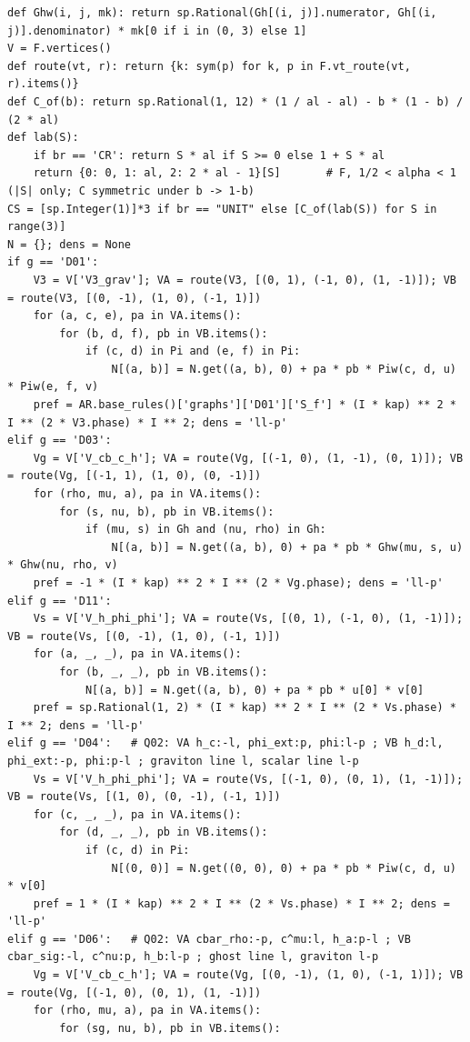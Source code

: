 \documentclass[10pt]{article}
\begin{document}
\begin{lstlisting}
def Ghw(i, j, mk): return sp.Rational(Gh[(i, j)].numerator, Gh[(i, j)].denominator) * mk[0 if i in (0, 3) else 1]
V = F.vertices()
def route(vt, r): return {k: sym(p) for k, p in F.vt_route(vt, r).items()}
def C_of(b): return sp.Rational(1, 12) * (1 / al - al) - b * (1 - b) / (2 * al)
def lab(S):
    if br == 'CR': return S * al if S >= 0 else 1 + S * al
    return {0: 0, 1: al, 2: 2 * al - 1}[S]       # F, 1/2 < alpha < 1 (|S| only; C symmetric under b -> 1-b)
CS = [sp.Integer(1)]*3 if br == "UNIT" else [C_of(lab(S)) for S in range(3)]
N = {}; dens = None
if g == 'D01':
    V3 = V['V3_grav']; VA = route(V3, [(0, 1), (-1, 0), (1, -1)]); VB = route(V3, [(0, -1), (1, 0), (-1, 1)])
    for (a, c, e), pa in VA.items():
        for (b, d, f), pb in VB.items():
            if (c, d) in Pi and (e, f) in Pi:
                N[(a, b)] = N.get((a, b), 0) + pa * pb * Piw(c, d, u) * Piw(e, f, v)
    pref = AR.base_rules()['graphs']['D01']['S_f'] * (I * kap) ** 2 * I ** (2 * V3.phase) * I ** 2; dens = 'll-p'
elif g == 'D03':
    Vg = V['V_cb_c_h']; VA = route(Vg, [(-1, 0), (1, -1), (0, 1)]); VB = route(Vg, [(-1, 1), (1, 0), (0, -1)])
    for (rho, mu, a), pa in VA.items():
        for (s, nu, b), pb in VB.items():
            if (mu, s) in Gh and (nu, rho) in Gh:
                N[(a, b)] = N.get((a, b), 0) + pa * pb * Ghw(mu, s, u) * Ghw(nu, rho, v)
    pref = -1 * (I * kap) ** 2 * I ** (2 * Vg.phase); dens = 'll-p'
elif g == 'D11':
    Vs = V['V_h_phi_phi']; VA = route(Vs, [(0, 1), (-1, 0), (1, -1)]); VB = route(Vs, [(0, -1), (1, 0), (-1, 1)])
    for (a, _, _), pa in VA.items():
        for (b, _, _), pb in VB.items():
            N[(a, b)] = N.get((a, b), 0) + pa * pb * u[0] * v[0]
    pref = sp.Rational(1, 2) * (I * kap) ** 2 * I ** (2 * Vs.phase) * I ** 2; dens = 'll-p'
elif g == 'D04':   # Q02: VA h_c:-l, phi_ext:p, phi:l-p ; VB h_d:l, phi_ext:-p, phi:p-l ; graviton line l, scalar line l-p
    Vs = V['V_h_phi_phi']; VA = route(Vs, [(-1, 0), (0, 1), (1, -1)]); VB = route(Vs, [(1, 0), (0, -1), (-1, 1)])
    for (c, _, _), pa in VA.items():
        for (d, _, _), pb in VB.items():
            if (c, d) in Pi:
                N[(0, 0)] = N.get((0, 0), 0) + pa * pb * Piw(c, d, u) * v[0]
    pref = 1 * (I * kap) ** 2 * I ** (2 * Vs.phase) * I ** 2; dens = 'll-p'
elif g == 'D06':   # Q02: VA cbar_rho:-p, c^mu:l, h_a:p-l ; VB cbar_sig:-l, c^nu:p, h_b:l-p ; ghost line l, graviton l-p
    Vg = V['V_cb_c_h']; VA = route(Vg, [(0, -1), (1, 0), (-1, 1)]); VB = route(Vg, [(-1, 0), (0, 1), (1, -1)])
    for (rho, mu, a), pa in VA.items():
        for (sg, nu, b), pb in VB.items():

\end{lstlisting}
\end{document}
